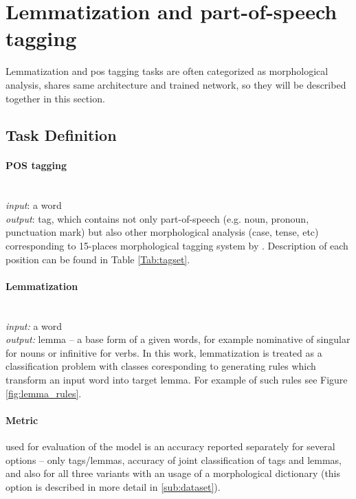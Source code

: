 \section{Lemmatization and part-of-speech tagging}
\label{chap:tag}
Lemmatization and \acrlong{pos} tagging tasks are often categorized as morphological analysis, shares same architecture and trained network, so they will be described together in this section.
\subsection{Task Definition}

\paragraph{\textbf{POS tagging}} \mbox{}\\
\textit{input}: a word \\
\textit{output}: tag, which contains not only part-of-speech (e.g. noun, pronoun, punctuation mark) but also other morphological analysis (case, tense, etc) corresponding to 15-places morphological tagging system by \cite{Hajic2004}. Description of each position can be found in Table \ref{Tab:tagset}.

\paragraph{\textbf{Lemmatization}} \mbox{}\\
\textit{input:} a word \\
\textit{output:} lemma -- a base form of a given words, for example nominative of singular for nouns or infinitive for verbs. In this work, lemmatization is treated as a classification problem with classes coresponding to generating rules which transform an input word into target lemma. For example of such rules see Figure \ref{fig:lemma_rules}. \\ %




\paragraph{Metric} used for evaluation of the model is an accuracy reported separately for several options -- only tags/lemmas, accuracy of joint classification of tags and lemmas, and  also for all three variants with an usage of a morphological dictionary (this option is described in more detail in \ref{sub:dataset}).

